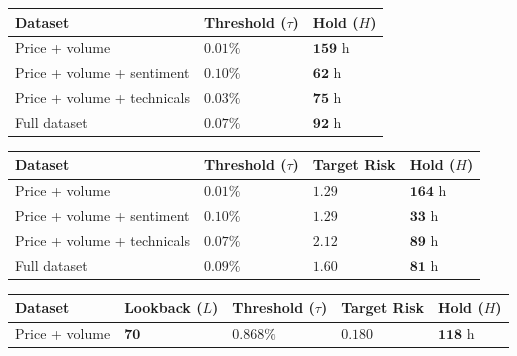 \begin{table}[htbp]
	\centering
	\renewcommand{\arraystretch}{1.1}
	\scriptsize
	\begin{minipage}[t]{0.48\textwidth}
		\centering
			\begin{tabular}{|p{3.4cm}|p{1.8cm}|p{1.5cm}|}
			\hline
				Dataset & \textbf{Threshold ($\tau$)} & \textbf{Hold ($H$)} \\
			\hline
				Price + volume & $\mathbf{0.01\%}$ & $\mathbf{159}$ h \\
			\hline
				Price + volume + sentiment & $\mathbf{0.10\%}$ & $\mathbf{62}$ h \\
			\hline
				Price + volume + technicals & $\mathbf{0.03\%}$ & $\mathbf{75}$ h \\
			\hline
				Full dataset & $\mathbf{0.07\%}$ & $\mathbf{92}$ h \\
			\hline
			\end{tabular}
	\end{minipage}
	\hfill
	\begin{minipage}[t]{0.48\textwidth}
		\centering
			\begin{tabular}{|p{3.0cm}|p{1.5cm}|p{1.3cm}|p{1.1cm}|}
			\hline
				Dataset & \textbf{Threshold ($\tau$)} & \textbf{Target Risk} & \textbf{Hold ($H$)} \\
			\hline
				Price + volume & $\mathbf{0.01\%}$ & $\mathbf{1.29}$ & $\mathbf{164}$ h \\
			\hline
				Price + volume + sentiment & $\mathbf{0.10\%}$ & $\mathbf{1.29}$ & $\mathbf{33}$ h \\
			\hline
				Price + volume + technicals & $\mathbf{0.07\%}$ & $\mathbf{2.12}$ & $\mathbf{89}$ h \\
			\hline
				Full dataset & $\mathbf{0.09\%}$ & $\mathbf{1.60}$ & $\mathbf{81}$ h \\
			\hline
			\end{tabular}
	\end{minipage}
	\par\vspace{0.6em}
	\begin{minipage}[t]{0.7\textwidth}
		\centering
			\begin{tabular}{|p{3.4cm}|p{1.5cm}|p{1.6cm}|p{1.4cm}|p{1.2cm}|}
			\hline
				Dataset & \textbf{Lookback ($L$)} & \textbf{Threshold ($\tau$)} & \textbf{Target Risk} & \textbf{Hold ($H$)} \\
			\hline
				Price + volume & $\mathbf{70}$ & $\mathbf{0.868\%}$ & $\mathbf{0.180}$ & $\mathbf{118}$ h \\

\end{tabular}
\end{minipage}
\end{table}
